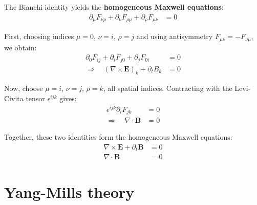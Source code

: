 The Bianchi identity yields the \textbf{homogeneous Maxwell equations}:
\begin{align*}
  \partial_\mu F_{\nu\rho} + \partial_\nu F_{\rho\mu} + \partial_\rho F_{\mu\nu} &= 0
\end{align*}

First, choosing indices \(\mu=0\), \(\nu=i\), \(\rho=j\) and using antisymmetry \(F_{\mu\nu} = -F_{\nu\mu}\), we obtain:
\begin{align*}
  \partial_0 F_{ij} + \partial_i F_{j0} + \partial_j F_{0i} &= 0 \\
  \Rightarrow \quad (\nabla \times \mathbf{E})_k + \partial_t B_k &= 0
\end{align*}

Now, choose \(\mu=i\), \(\nu=j\), \(\rho=k\), all spatial indices. Contracting with the Levi-Civita tensor \(\epsilon^{ijk}\) gives:
\begin{align*}
  \epsilon^{ijk} \partial_i F_{jk} &= 0 \\
  \Rightarrow \quad \nabla \cdot \mathbf{B} &= 0
\end{align*}

Together, these two identities form the homogeneous Maxwell equations:
\begin{align*}
  \nabla \times \mathbf{E} + \partial_t \mathbf{B} &= 0 \\
  \nabla \cdot \mathbf{B} &= 0
\end{align*}



\section{Yang-Mills theory}

